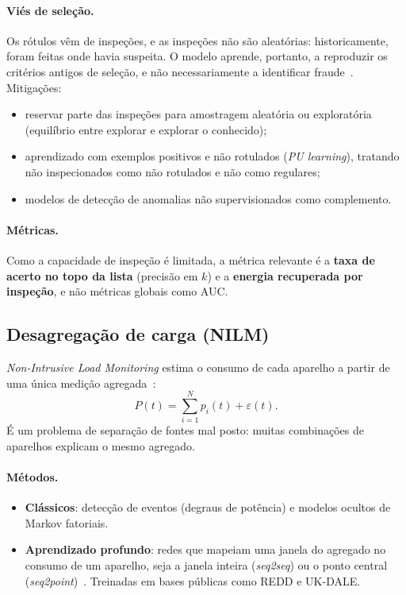 \documentclass[11pt,a4paper]{article}
\begin{document}
\paragraph{Viés de seleção.} Os rótulos vêm de inspeções, e as inspeções não
são aleatórias: historicamente, foram feitas onde havia suspeita. O modelo
aprende, portanto, a reproduzir os critérios antigos de seleção, e não
necessariamente a identificar fraude~\cite{ntlreview}. Mitigações:
\begin{itemize}
  \item reservar parte das inspeções para amostragem aleatória ou exploratória
    (equilíbrio entre explorar e explorar o conhecido);
  \item aprendizado com exemplos positivos e não rotulados (\textit{PU
    learning}), tratando não inspecionados como não rotulados e não como
    regulares;
  \item modelos de detecção de anomalias não supervisionados como
    complemento.
\end{itemize}

\paragraph{Métricas.} Como a capacidade de inspeção é limitada, a métrica
relevante é a \textbf{taxa de acerto no topo da lista} (precisão em $k$) e a
\textbf{energia recuperada por inspeção}, e não métricas globais como AUC.

\subsection{Desagregação de carga (NILM)}

\textit{Non-Intrusive Load Monitoring} estima o consumo de cada aparelho a
partir de uma única medição agregada~\cite{hart}:
\begin{equation}
  P(t) = \sum_{i=1}^{N} p_i(t) + \varepsilon(t).
\end{equation}
É um problema de separação de fontes mal posto: muitas combinações de
aparelhos explicam o mesmo agregado.

\paragraph{Métodos.}
\begin{itemize}
  \item \textbf{Clássicos}: detecção de eventos (degraus de potência) e
    modelos ocultos de Markov fatoriais.
  \item \textbf{Aprendizado profundo}: redes que mapeiam uma janela do
    agregado no consumo de um aparelho, seja a janela inteira
    (\textit{seq2seq}) ou o ponto central (\textit{seq2point})~\cite{kelly,seq2point}.
    Treinadas em bases públicas como REDD e UK-DALE.
\end{itemize}
\end{document}
